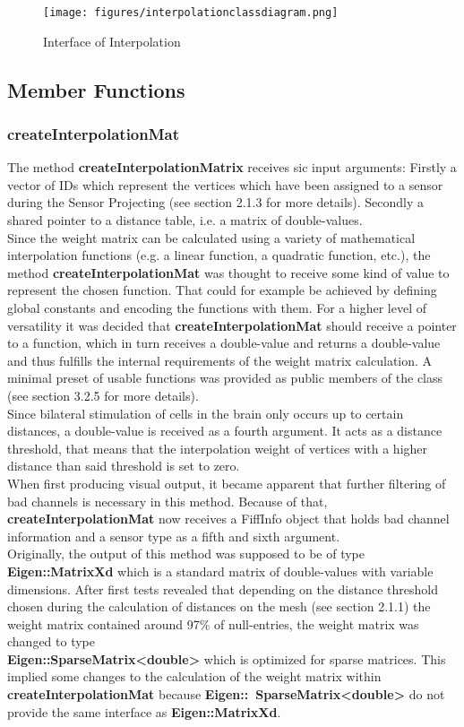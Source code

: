 \begin{figure}[h]
	\begin{center}
		\texttt{[image: figures/interpolationclassdiagram.png]}
		\caption{Interface of Interpolation}
	\end{center}
\end{figure}

\subsection{Member Functions}

\subsubsection{createInterpolationMat}
The method \textbf{createInterpolationMatrix} receives sic input arguments: Firstly a vector of IDs which represent the vertices which have been assigned to a sensor during the Sensor Projecting (see section 2.1.3 for more details). Secondly a shared pointer to a distance table, i.e. a matrix of double-values.\\
Since the weight matrix can be calculated using a variety of mathematical interpolation functions (e.g. a linear function, a quadratic function, etc.), the method \textbf{createInterpolationMat} was thought to receive some kind of value to represent the chosen function. That could for example be achieved by defining global constants and encoding the functions with them. For a higher level of versatility it was decided that \textbf{createInterpolationMat} should receive a pointer to a function, which in turn receives a double-value and returns a double-value and thus fulfills the internal requirements of the weight matrix calculation. A minimal preset of usable functions was provided as public members of the class (see section 3.2.5 for more details).\\
Since bilateral stimulation of cells in the brain only occurs up to certain distances, a double-value is received as a fourth argument. It acts as a distance threshold, that means that the interpolation weight of vertices with a higher distance than said threshold is set to zero.\\
When first producing visual output, it became apparent that further filtering of bad channels is necessary in this method. Because of that, \textbf{createInterpolationMat} now receives a FiffInfo object that holds bad channel information and a sensor type as a fifth and sixth argument.\\
Originally, the output of this method was supposed to be of type \textbf{Eigen::MatrixXd} which is a standard matrix of double-values with variable dimensions. After first tests revealed that depending on the distance threshold chosen during the calculation of distances on the mesh (see section 2.1.1) the weight matrix contained around 97\% of null-entries, the weight matrix was changed to type\\ \textbf{Eigen::SparseMatrix<double>} which is optimized for sparse matrices. This implied some changes to the calculation of the weight matrix within \textbf{createInterpolationMat} because \textbf{Eigen::\ SparseMatrix<double>} do not provide the same interface as \textbf{Eigen::MatrixXd}.

